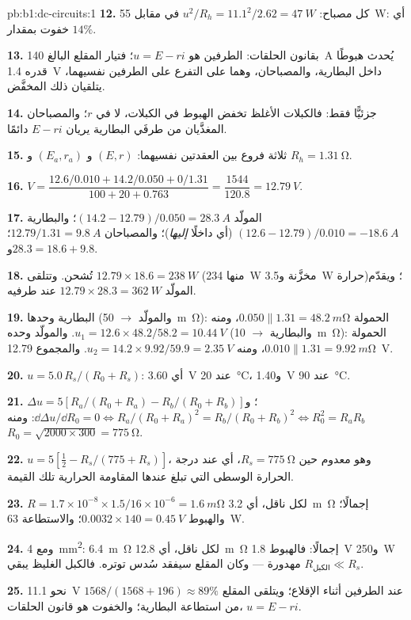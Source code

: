 \begin{solution}{pb:b1:dc-circuits:1}
\textbf{12.} كل مصباح: $u^2/R_h = 11.1^2/2.62 = \qty{47}{W}$ في مقابل
\qty{55}{W}: أي خفوت بمقدار $14\%$.

\textbf{13.} بقانون الحلقات:  الطرفين هو $u = E - ri$؛ فتيار
المقلع البالغ \qty{140}{A} يُحدث هبوطًا قدره \qty{1.4}{V} داخل البطارية،
والمصباحان، وهما على التفرع على الطرفين نفسيهما، يتلقيان ذلك 
المخفَّض.

\textbf{14.} جزئيًّا فقط: فالكبلات الأغلظ تخفض الهبوط في الكبلات،
لا في $r$؛ والمصباحان المغذَّيان من طرفَي البطارية يريان $E - ri$ دائمًا.

\textbf{15.} ثلاثة فروع بين العقدتين نفسيهما: $(E, r)$ و
$(E_a, r_a)$ و $R_h = \qty{1.31}{\ohm}$.

\textbf{16.} $V = \dfrac{12.6/0.010 + 14.2/0.050 + 0/1.31}{100 + 20 + 0.763}
= \dfrac{1544}{120.8} = \qty{12.79}{V}$.

\textbf{17.} المولّد $(14.2 - 12.79)/0.050 = \qty{28.3}{A}$؛ والبطارية
$(12.6 - 12.79)/0.010 = \qty{-18.6}{A}$ (أي داخلًا \emph{إليها})؛ والمصباحان
$12.79/1.31 = \qty{9.8}{A}$؛ و$28.3 = 18.6 + 9.8$.

\textbf{18.} تُشحن. وتتلقى $12.79 \times 18.6 = \qty{238}{W}$
(منها \qty{234}{W} مخزَّنة و\qty{3.5}{W} حرارة)؛ ويقدّم المولّد
$12.79 \times 28.3 = \qty{362}{W}$ عند طرفيه.

\textbf{19.} البطارية وحدها (والمولّد $\to$ \qty{50}{m\ohm}): الحمولة
$0.050 \parallel 1.31 = \qty{48.2}{m\ohm}$، ومنه $u_1 = 12.6 \times 48.2/58.2 =
\qty{10.44}{V}$. والمولّد وحده (والبطارية $\to$ \qty{10}{m\ohm}): الحمولة
$0.010 \parallel 1.31 = \qty{9.92}{m\ohm}$، ومنه $u_2 = 14.2 \times 9.92/59.9 =
\qty{2.35}{V}$. والمجموع \qty{12.79}{V}.

\textbf{20.} $u = 5.0\,R_s/(R_0 + R_s)$: أي \qty{3.60}{V} عند
\qty{20}{\degreeCelsius}، و\qty{1.40}{V} عند \qty{90}{\degreeCelsius}.

\textbf{21.} $\Delta u = 5[R_a/(R_0 + R_a) - R_b/(R_0 + R_b)]$؛
و$\dd\Delta u/\dd R_0 = 0 \Leftrightarrow R_a/(R_0 + R_a)^2 = R_b/(R_0 +
R_b)^2 \Leftrightarrow R_0^2 = R_aR_b$: ومنه $R_0 = \sqrt{2000 \times 300} =
\qty{775}{\ohm}$.

\textbf{22.} $u = 5[\tfrac12 - R_s/(775 + R_s)]$، وهو معدوم حين $R_s =
\qty{775}{\ohm}$، أي عند درجة الحرارة الوسطى التي تبلغ عندها
المقاومة الحرارية تلك القيمة.

\textbf{23.} $R = 1.7\times10^{-8} \times 1.5/16\times10^{-6} =
\qty{1.6}{m\ohm}$ لكل ناقل، أي \qty{3.2}{m\ohm} إجمالًا؛ والهبوط $0.0032
\times 140 = \qty{0.45}{V}$؛ والاستطاعة \qty{63}{W}.

\textbf{24.} ومع \qty{4}{mm^2}: \qty{6.4}{m\ohm} لكل ناقل، أي \qty{12.8}{m\ohm}
إجمالًا: فالهبوط \qty{1.8}{V} و\qty{250}{W} مهدورة --- وكان المقلع سيفقد
سُدس توتره. فالكبل الغليظ يبقي $R_{\text{الكبل}} \ll R_s$.

\textbf{25.} نحو \qty{11.1}{V} عند الطرفين أثناء الإقلاع؛ ويتلقى
المقلع $1568/(1568 + 196) \approx 89\%$ من استطاعة البطارية؛
والخفوت هو قانون الحلقات، $u = E - ri$.
\end{solution}

